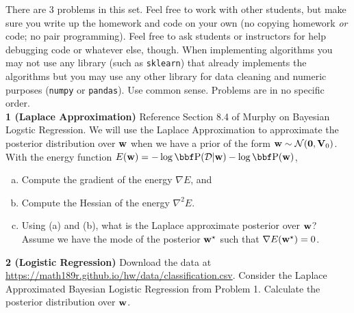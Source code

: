 \documentclass[12pt,letterpaper,fleqn]{hmcpset}
\begin{document}
There are 3 problems in this set.
Feel free to work with other students, but make sure you write up the homework
and code on your own (no copying homework \textit{or} code; no pair programming).
Feel free to ask students or instructors for help debugging code or whatever else,
though.
When implementing algorithms you may not use any library (such as \texttt{sklearn})
that already implements the algorithms but you may use any other library for
data cleaning and numeric purposes (\texttt{numpy} or \texttt{pandas}). Use common
sense. Problems are in no specific order.\\[1em]

\textbf{1 (Laplace Approximation)} Reference Section 8.4 of Murphy on Bayesian Logstic Regression. We will
use the Laplace Approximation to approximate the posterior distribution over
${\bf w}$ when we have a prior of the form ${\bf w} \sim {\cal N}({\bf 0}, {\bf V}_0)$. With the energy
function $E(\ww) = -\log\PP(\Dc|\ww) - \log\PP(\ww)$,
\begin{enumerate}[(a)]
    \item Compute the gradient of the energy $\nabla E$, and
    \item Compute the Hessian of the energy $\nabla^2 E$.
    \item Using (a) and (b), what is the Laplace approximate posterior over
        ${\bf w}$? Assume we have the mode of the posterior ${\bf w}^\star$ such
        that $\nabla E({\bf w}^\star) = 0$.
\end{enumerate}

\textbf{2 (Logistic Regression)} Download the data at
\url{https://math189r.github.io/hw/data/classification.csv}. Consider the Laplace Approximated
Bayesian Logistic Regression from Problem 1. Calculate the posterior distribution
over ${\bf w}$.
\end{document}
